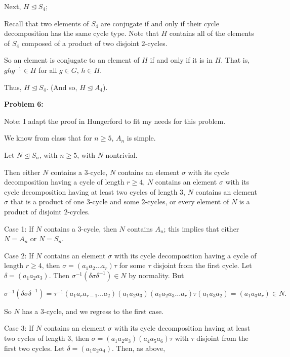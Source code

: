 \documentclass[a4paper,12pt]{article}
\newcommand{\tab}{\hspace{4mm}} %
\newcommand{\shunt}{\vspace{20mm}}
\newcommand{\de}{\delta}
\newcommand{\subgp}{\mathrel{\unlhd}}
\begin{document}
Next, $H \subgp S_4$;

\tab Recall that two elements of $S_4$ are conjugate if and only if their cycle decomposition has the same cycle type. Note that $H$ contains all of the elements of $S_4$ composed of a product of two disjoint $2$-cycles.

\tab So an element is conjugate to an element of $H$ if and only if it is in $H$. That is, $ghg^{-1} \in H$ for all $g \in G$, $h \in H$.

Thus, $H \subgp S_4$. (And so, $H \subgp A_4$).

\shunt

{\bf Problem 6:}

Note: I adapt the proof in Hungerford to fit my needs for this problem.

We know from class that for $n \geq 5$, $A_n$ is simple.

Let $N \subgp S_n$, with $n \geq 5$, with $N$ nontrivial.

Then either $N$ contains a $3$-cycle, $N$ contains an element $\sigma$ with its cycle decomposition having a cycle of length $r \geq 4$, $N$ contains an element $\sigma$ with its cycle decomposition having at least two cycles of length $3$, $N$ contains an element $\sigma$ that is a product of one $3$-cycle and some $2$-cycles, or every element of $N$ is a product of disjoint $2$-cycles.

\tab Case 1: If $N$ contains a $3$-cycle, then $N$ contains $A_n$; this implies that either $N=A_n$ or $N = S_n$.

\tab Case 2: If $N$ contains an element $\sigma$ with its cycle decomposition having a cycle of length $r \geq 4$, then $\sigma = (a_1a_2\ldots a_r)\tau$ for some $\tau$ disjoint from the first cycle. Let $\de = (a_1a_2a_3)$. Then $\sigma^{-1}(\de \sigma \de^{-1}) \in N$ by normality. But

\begin{displaymath}
\sigma^{-1}(\de \sigma \de^{-1}) = \tau^{-1}(a_1a_ra_{r-1} \ldots a_2)(a_1a_2a_3)(a_1a_2a_3 \ldots a_r)\tau (a_1a_3a_2) = (a_1a_3a_r) \in N.
\end{displaymath}


\tab So $N$ has a $3$-cycle, and we regress to the first case.

\tab Case 3: If $N$ contains an element $\sigma$ with its cycle decomposition having at least two cycles of length $3$, then $\sigma = (a_1a_2a_3)(a_4a_5a_6)\tau$ with $\tau$ disjoint from the first two cycles. Let $\de = (a_1a_2a_4)$. Then, as above, 
\end{document}
